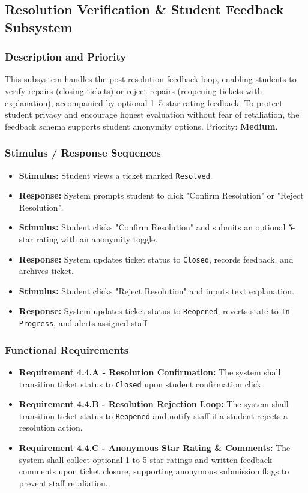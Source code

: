 \documentclass[12pt, a4paper]{article}
\begin{document}
\subsection{Resolution Verification \& Student Feedback Subsystem}

\subsubsection{Description and Priority}
This subsystem handles the post-resolution feedback loop, enabling students to verify repairs (closing tickets) or reject repairs (reopening tickets with explanation), accompanied by optional 1--5 star rating feedback. To protect student privacy and encourage honest evaluation without fear of retaliation, the feedback schema supports student anonymity options. Priority: \textbf{Medium}.

\subsubsection{Stimulus / Response Sequences}
\begin{itemize}[leftmargin=*]
    \item \textbf{Stimulus:} Student views a ticket marked \texttt{Resolved}.
    \item \textbf{Response:} System prompts student to click "Confirm Resolution" or "Reject Resolution".
    \item \textbf{Stimulus:} Student clicks "Confirm Resolution" and submits an optional 5-star rating with an anonymity toggle.
    \item \textbf{Response:} System updates ticket status to \texttt{Closed}, records feedback, and archives ticket.
    \item \textbf{Stimulus:} Student clicks "Reject Resolution" and inputs text explanation.
    \item \textbf{Response:} System updates ticket status to \texttt{Reopened}, reverts state to \texttt{In Progress}, and alerts assigned staff.
\end{itemize}

\subsubsection{Functional Requirements}
\begin{itemize}[leftmargin=*]
    \item \textbf{Requirement 4.4.A - Resolution Confirmation:} The system shall transition ticket status to \texttt{Closed} upon student confirmation click.
    \item \textbf{Requirement 4.4.B - Resolution Rejection Loop:} The system shall transition ticket status to \texttt{Reopened} and notify staff if a student rejects a resolution action.
    \item \textbf{Requirement 4.4.C - Anonymous Star Rating \& Comments:} The system shall collect optional 1 to 5 star ratings and written feedback comments upon ticket closure, supporting anonymous submission flags to prevent staff retaliation.
\end{itemize}
\end{document}
